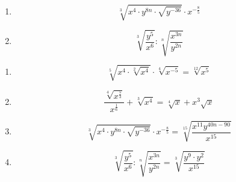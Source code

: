 {{\begin{multicols}{2}
\begin{enumerate}[label=\alph*)]
 \item $$\sqrt[3]{x^4\cdot{} y^{8n}\cdot{}  \sqrt{y^{-36}}} \cdot{} x^{-\frac85}$$

 \item $$ \sqrt[3]{\frac{y^5}{x^6}}   : \sqrt[n]{\frac{x^{3n}}{y^{2n}}}$$
 \end{enumerate}
\end{multicols}

}{%
\begin{enumerate}[label=\alph*)]
  \item $$\sqrt[5]{x^4\cdot{}\sqrt[2]{x^4}} \cdot{} \sqrt[4]{x^{-5}}
    = \sqrt[12]{x^5}$$

  \item $$\frac{\sqrt[4]{x^{\frac53}}}{x^{\frac16}} + \sqrt[3]{x^4} =
    \sqrt[4]{x} + x^3\sqrt{x}$$

 \item $$\sqrt[3]{x^4\cdot{} y^{8n}\cdot{}  \sqrt{y^{-36}}} \cdot{}
   x^{-\frac85} = \sqrt[15]{\frac{x^11y^{40n-90}}{x^{15}}}$$

 \item $$ \sqrt[3]{\frac{y^5}{x^6}}   :
   \sqrt[n]{\frac{x^{3n}}{y^{2n}}} = \sqrt[3]{\frac{y^9\cdot{}y^2}{x^{15}}}$$
 \end{enumerate}
}%











}
